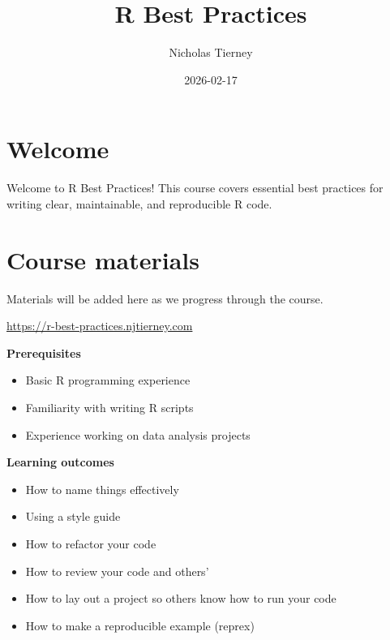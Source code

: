 \documentclass[
  letterpaper,
  justified,
  a4paper]{tufte-book}
\title{R Best Practices}
\author{Nicholas Tierney}
\date{2026-02-17}
\providecommand{\tightlist}{%
  \setlength{\itemsep}{0pt}\setlength{\parskip}{0pt}}
\providecommand{\tightlist}{%
  \setlength{\itemsep}{0pt}\setlength{\parskip}{0pt}}
\renewcommand*\contentsname{Table of contents}
\newcommand\contentsname{Table of contents}
\begin{document}
\frontmatter
\maketitle

\renewcommand*\contentsname{Table of contents}
{
\setcounter{tocdepth}{2}
\tableofcontents
}

\mainmatter
{}

\chapter*{Welcome}\label{welcome}


Welcome to R Best Practices! This course covers essential best practices
for writing clear, maintainable, and reproducible R code.


\chapter*{Course materials}\label{course-materials}


Materials will be added here as we progress through the course.

\url{https://r-best-practices.njtierney.com}

\textbf{Prerequisites}

\begin{itemize}
\tightlist
\item
  Basic R programming experience
\item
  Familiarity with writing R scripts
\item
  Experience working on data analysis projects
\end{itemize}

\textbf{Learning outcomes}

\begin{itemize}
\tightlist
\item
  How to name things effectively
\item
  Using a style guide
\item
  How to refactor your code
\item
  How to review your code and others'
\item
  How to lay out a project so others know how to run your code
\item
  How to make a reproducible example (reprex)
\end{itemize}
\end{document}
